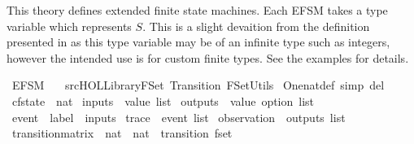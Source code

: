 %
\begin{isabellebody}%
%
%
\isadelimdocument
%
\endisadelimdocument
%
\isatagdocument
%
\isamarkuptrue%
%
\endisatagdocument
{\isafolddocument}%
%
\isadelimdocument
%
\endisadelimdocument
%
\begin{isamarkuptext}%
This theory defines extended finite state machines. Each EFSM takes a type variable which represents
$S$. This is a slight devaition from the definition presented in \cite{foster2018} as this
type variable may be of an infinite type such as integers, however the intended use is for custom
finite types. See the examples for details.%
\end{isamarkuptext}\isamarkuptrue%
%
\isadelimtheory
%
\endisadelimtheory
%
\isatagtheory
{}\isamarkupfalse%
\ EFSM\isanewline
\ \ \ {\isachardoublequoteopen}{\isachartilde}{\isachartilde}{\isacharslash}src{\isacharslash}HOL{\isacharslash}Library{\isacharslash}FSet{\isachardoublequoteclose}\ Transition\ FSet{\isacharunderscore}Utils\isanewline
{}%
\endisatagtheory
{\isafoldtheory}%
%
\isadelimtheory
%
\endisadelimtheory
\isanewline
\isanewline
{}\isamarkupfalse%
\ One{\isacharunderscore}nat{\isacharunderscore}def\ {\isacharbrackleft}simp\ del{\isacharbrackright}\isanewline
\isanewline
{}\isamarkupfalse%
\ cfstate\ {\isacharequal}\ nat\isanewline
{}\isamarkupfalse%
\ inputs\ {\isacharequal}\ {\isachardoublequoteopen}value\ list{\isachardoublequoteclose}\isanewline
{}\isamarkupfalse%
\ outputs\ {\isacharequal}\ {\isachardoublequoteopen}value\ option\ list{\isachardoublequoteclose}\isanewline
\isanewline
{}\isamarkupfalse%
\ event\ {\isacharequal}\ {\isachardoublequoteopen}{\isacharparenleft}label\ {\isasymtimes}\ inputs{\isacharparenright}{\isachardoublequoteclose}\isanewline
{}\isamarkupfalse%
\ trace\ {\isacharequal}\ {\isachardoublequoteopen}event\ list{\isachardoublequoteclose}\isanewline
{}\isamarkupfalse%
\ observation\ {\isacharequal}\ {\isachardoublequoteopen}outputs\ list{\isachardoublequoteclose}\isanewline
{}\isamarkupfalse%
\ transition{\isacharunderscore}matrix\ {\isacharequal}\ {\isachardoublequoteopen}{\isacharparenleft}{\isacharparenleft}nat\ {\isasymtimes}\ nat{\isacharparenright}\ {\isasymtimes}\ transition{\isacharparenright}\ fset{\isachardoublequoteclose}\isanewline

\end{isabellebody}
